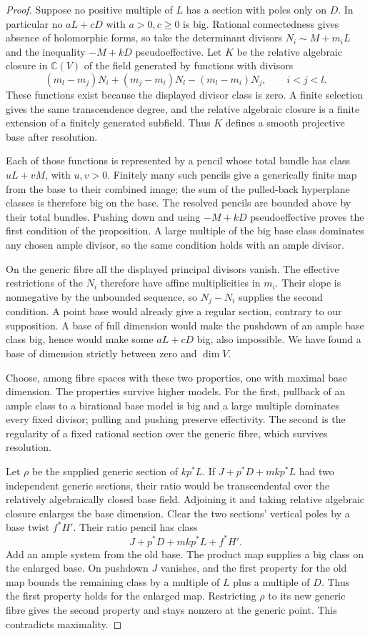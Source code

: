 \begin{proof}
Suppose no positive multiple of $L$ has a section with poles only on
$D$.  In particular no $aL+cD$ with $a>0,c\geq0$ is big.
Rational connectedness gives absence of holomorphic forms, so take
the determinant divisors $N_i\sim M+m_iL$ and the inequality
$-M+kD$ pseudoeffective.  Let $K$ be the relative algebraic closure in
$\mathbb C(V)$ of the field generated by functions with divisors
\[
 (m_l-m_j)N_i+(m_j-m_i)N_l-(m_l-m_i)N_j,
                           \qquad i<j<l.
\]
These functions exist because the displayed divisor class is zero.
A finite selection gives the same transcendence degree, and the
relative algebraic closure is a finite extension of a finitely
generated subfield.  Thus $K$ defines a smooth projective base after
resolution.

Each of those functions is represented by a pencil whose total
bundle has class $uL+vM$, with $u,v>0$.  Finitely many such pencils give
a generically finite map from the base to their combined image; the
sum of the pulled-back hyperplane classes is therefore big on the
base.  The resolved pencils are bounded above by their total bundles.
Pushing down and using $-M+kD$ pseudoeffective proves the first
condition of the proposition.  A large multiple of the big base
class dominates any chosen ample divisor, so the same condition holds
with an ample divisor.

On the generic fibre all the displayed principal divisors vanish.
The effective restrictions of the $N_i$ therefore have affine
multiplicities in $m_i$.  Their slope is nonnegative by the unbounded
sequence, so $N_j-N_i$ supplies the second condition.  A point base
would already give a regular section, contrary to our supposition.
A base of full dimension would make the pushdown of an ample base
class big, hence would make some $aL+cD$ big, also impossible.
We have found a base of dimension strictly between zero and $\dim V$.

Choose, among fibre spaces with these two properties, one with maximal
base dimension.  The properties survive higher models.  For the first,
pullback of an ample class to a birational base model is big and a
large multiple dominates every fixed divisor; pulling and pushing
preserve effectivity.  The second is the regularity of a fixed rational
section over the generic fibre, which survives resolution.

Let $\rho$ be the supplied generic section of $kp^*L$.  If
$J+p^*D+mkp^*L$ had two independent generic sections, their ratio would
be transcendental over the relatively algebraically closed base field.
Adjoining it and taking relative algebraic closure enlarges the base
dimension.  Clear the two sections' vertical poles by a base twist
$f^*H'$.  Their ratio pencil has class
\[
                    J+p^*D+mkp^*L+f^*H'.
\]
Add an ample system from the old base.  The product map supplies a big
class on the enlarged base.  On pushdown $J$ vanishes, and the first
property for the old map bounds the remaining class by a multiple of
$L$ plus a multiple of $D$.  Thus the first property holds for the
enlarged map.  Restricting $\rho$ to its new generic fibre gives the
second property and stays nonzero at the generic point.  This
contradicts maximality.


\end{proof}
